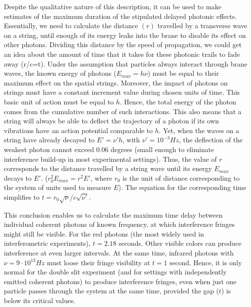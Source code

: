 \documentclass[a4paper,aps,prl,twocolumn,showpacs]{revtex4}
\begin{document}
Despite the qualitative nature of this description, it can be used
to make estimates of the maximum duration of the stipulated
delayed photonic effects. Essentially, we need to calculate the
distance $(r)$ travelled by a transverse wave on a string, until
enough of its energy leaks into the brane to disable its effect on
other photons. Dividing this distance by the speed of propagation,
we could get an idea about the amount of time that it takes for
these photonic trails to fade away (r/c=t). Under the assumption
that particles always interact through brane waves, the known
energy of photons ($E_{max}=h\nu$) must be equal to their maximum
effect on the spatial strings. Moreover, the impact of photons on
strings must have a constant increment value during chosen units
of time. This basic unit of action must be equal to $h$. Hence,
the total energy of the photon comes from the cumulative number of
such interactions. This also means that a string will always be
able to deflect the trajectory of a photon if its own vibrations
have an action potential comparable to $h$. Yet, when the waves on
a string have already decayed to $E'=\nu'h$, with
$\nu'=10^{-3}Hz$, the deflection of the weakest photon cannot
exceed $0.06$ degrees (small enough to eliminate interference
build-up in most experimental settings). Thus, the value of $r$
corresponds to the distance travelled by a string wave until its
energy $E_{max}$ decays to $E'$. ($r_{0}^{2}E_{max}=r^{2}E'$,
where $r_{0}$ is the unit of distance corresponding to the system
of units used to measure $E$). The equation for the corresponding
time simplifies to $t=r_{0}\sqrt{\nu}/c\sqrt{\nu'}$.

This conclusion enables us to calculate the maximum time delay
between individual coherent photons of known frequency, at which
interference fringes might still be visible. For the red photons
(the most widely used in interferometric experiments), $t=2.18$
seconds. Other visible colors can produce interference at even
larger intervals. At the same time, infrared photons with
$\nu=9\cdot 10^{13} Hz$ must loose their fringe visibility at
$t=1$ second. Hence, it is only normal for the double slit
experiment (and for settings with independently emitted coherent
photons) to produce interference fringes, even when just one
particle passes through the system at the same time, provided the gap ($t$)
is below its critical values.
\end{document}
